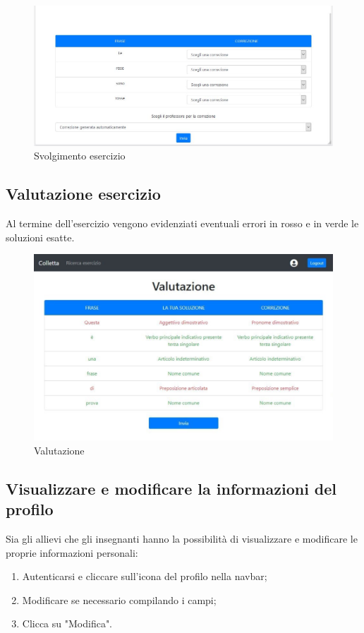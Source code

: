 \documentclass[11pt,a4paper]{article}
\begin{document}
{	\begin{figure}[h!]
		\centering
		\includegraphics[scale=0.65]{images/svolgimento.jpg}
		\caption{Svolgimento esercizio}
	\end{figure}
	
	\newpage
	
	\subsection{Valutazione esercizio}
	Al termine dell'esercizio vengono evidenziati eventuali errori in rosso e in verde le soluzioni esatte.
		\begin{figure}[h!]
		\centering
		\includegraphics[scale=0.65]{images/valutazione.jpg}
		\caption{Valutazione}
	\end{figure}
	
	\subsection{Visualizzare e modificare la informazioni del profilo}
	Sia gli allievi che gli insegnanti hanno la possibilità di visualizzare e modificare le proprie informazioni personali:
	\begin{enumerate}
		\item Autenticarsi e cliccare sull'icona del profilo nella navbar;
		\item Modificare se necessario compilando i campi;
		\item Clicca su "Modifica".
	\end{enumerate}

}
\end{document}
